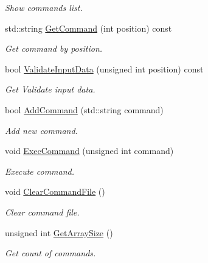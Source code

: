 \begin{DoxyCompactItemize}
\begin{DoxyCompactList}\small\item\em Show commands list. \end{DoxyCompactList}\item 
std::string \hyperlink{classcCommandProcess_ae0cd3a821061315489b79778a916e153}{GetCommand} (int position) const 
\begin{DoxyCompactList}\small\item\em Get command by position. \end{DoxyCompactList}\item 
bool \hyperlink{classcCommandProcess_a772e2a1a70fbc0664ac0c3f147d228ba}{ValidateInputData} (unsigned int position) const 
\begin{DoxyCompactList}\small\item\em Get Validate input data. \end{DoxyCompactList}\item 
bool \hyperlink{classcCommandProcess_a59680f067cb8cd12e656316eb88b5c49}{AddCommand} (std::string command)
\begin{DoxyCompactList}\small\item\em Add new command. \end{DoxyCompactList}\item 
void \hyperlink{classcCommandProcess_a97d77e430582c43476c9e08f62891820}{ExecCommand} (unsigned int command)
\begin{DoxyCompactList}\small\item\em Execute command. \end{DoxyCompactList}\item 
\hypertarget{classcCommandProcess_a110276a333c3dd6276e552e1b45d7239}{
void \hyperlink{classcCommandProcess_a110276a333c3dd6276e552e1b45d7239}{ClearCommandFile} ()}
\label{classcCommandProcess_a110276a333c3dd6276e552e1b45d7239}

\begin{DoxyCompactList}\small\item\em Clear command file. \end{DoxyCompactList}\item 
unsigned int \hyperlink{classcCommandProcess_a3bf9814ce9c73562fd1ad4e3552f44c9}{GetArraySize} ()
\begin{DoxyCompactList}\small\item\em Get count of commands. \end{DoxyCompactList}\end{DoxyCompactItemize}


